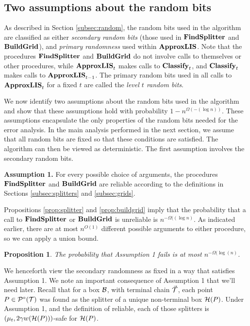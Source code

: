 \documentclass{acmsmall}
\newtheorem{prop}[theorem]{Proposition}
\newcommand{\cB}{{\cal B}}
\newcommand{\cH}{{\cal H}}
\newcommand{\cP}{{\cal P}}
\newcommand{\cT}{{\cal T}}
\newcommand{\lis}{{\tt lis}}
\newcommand{\classify}{{\rm {\bf Classify}}}
\newcommand{\approxlis}{{\rm {\bf ApproxLIS}}}
\newcommand{\findsplitter}{{\rm {\bf FindSplitter}}}
\newcommand{\buildgrid}{{\rm {\bf BuildGrid}}}
\begin{document}
\subsection{Two assumptions about  the random bits}
\label{subsec:assumptions}

As described in Section \ref{subsec:random}, the random bits used in the algorithm are classified as 
either {\em secondary random bits} (those used in $\findsplitter$ and $\buildgrid$), and  {\em primary
randomness} used within $\approxlis$.
  Note that the procedures $\findsplitter$ and $\buildgrid$
do not involve calls to themselves or other procedures, while $\approxlis_t$  makes calls to $\classify_t$, and $\classify_t$ makes
calls to $\approxlis_{t-1}$.    The primary random bits used in all calls
to $\approxlis_t$ for a fixed $t$ are called the {\em level $t$ random bits}.

We now identify two assumptions about the random bits used in the algorithm
and show that these assumptions hold with probability $1-n^{\Omega(-(\log n))}$. 
These assumptions encapsulate the only properties of  the random bits needed for the error analysis.
In the main analysis performed in the next section, we assume that
all random bits are fixed so that these conditions are satisfied.  
The algorithm can then be viewed as deterministic.
The first assumption involves the secondary random bits.

\smallskip
\noindent
{\bf Assumption 1.}  For every possible 
choice of arguments, the procedures $\findsplitter$ and $\buildgrid$ are reliable according to the definitions in Sections \ref{subsec:splitters} and \ref{subsec:grids}.

\smallskip

Propositions \ref{prop:splitter} and \ref{prop:buildgrid} imply that the probability that a call to $\findsplitter$ or $\buildgrid$ is unreliable
is $n^{-\Omega((\log n)}$.  As indicated earlier, there are at most $n^{O(1)}$ different possible arguments to
either procedure, so we can apply a union bound.

\begin{prop}
\label{prop:assumption 1}
The probability that Assumption 1 fails is at most $n^{-\Omega(\log(n)}$.
\end{prop}


We henceforth view the secondary randomness as fixed in a way that satisfies Assumption 1.
We note an important consequence of Assumption 1 that we'll need later.
Recall that for a box $\cB$, with terminal chain $\vec{\cT}$,
each point $P \in \cP^{\circ}(\cT)$ was found as the splitter of a unique non-terminal box
$\cH(P)$.  Under Assumption 1,  and the definition of reliable, each of those splitters is 
$(\mu_t,2\gamma w(\cH(P)))$-safe for $\cH(P)$.
\end{document}

